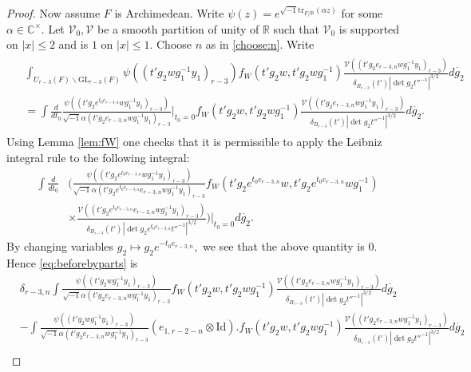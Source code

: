 \documentclass[12pt]{amsart}
\theoremstyle{remark}
\numberwithin{equation}{section}
\newcommand{\GL}{\mathrm{GL}}
\newcommand{\CC}{\mathbb{C}}
\newcommand{\RR}{\mathbb{R}}
\theoremstyle{definition}
\numberwithin{equation}{subsection}
\begin{document}
\begin{proof}
Now assume $F$ is Archimedean. 
Write $\psi(z)=e^{\sqrt{-1}\mathrm{tr}_{F/\RR}(\alpha z)}$ for some $\alpha \in \CC^\times.$  
Let $\mathcal{V}_0,\mathcal{V}$ be a smooth partition of unity of $\RR$ such that $\mathcal{V}_0$ is supported on $|x|\le 2$ and is $1$ on $|x|\le 1$. 
Choose $n$ as in \eqref{choose:n}. 
Write 
\begin{align}\begin{split}\label{eq:beforebyparts}
    &\int_{ U_{r-3}(F) \backslash \GL_{r-3}(F)}  \psi((t'g_2w g_1^{-1}y_1)_{r-3})f_{W}(t'g_2w,t'g_2wg_1^{-1})\frac{\mathcal{V}\left((t'g_2e_{r-3,n} wg_1^{-1}y_1)_{r-3}\right)}{\delta_{B_{r-3}}(t')|\det g_2t''^{-1}|^{3/2}}d\dot{g_2}\\
    &=\int \frac{d}{dt_0} \frac{\psi((t'g_2e^{t_0e_{r-3,n}}wg_1^{-1}y_1)_{r-3})}{\sqrt{-1}\alpha(t'g_2e_{r-3,n} wg_1^{-1}y_1)_{r-3}}\Bigg|_{t_0=0}f_{W}(t'g_2w,t'g_2wg_1^{-1})\frac{\mathcal{V}\left((t'g_2e_{r-3,n}w g_1^{-1}y_1)_{r-3}\right)}{\delta_{B_{r-3}}(t')|\det g_2t''^{-1}|^{3/2}}d\dot{g_2}. \end{split}
\end{align}
Using Lemma \ref{lem:fW} one checks that it is permissible to apply the 
 Leibniz integral rule to the following integral:
\begin{align*}
     \int \frac{d}{dt_0} &\Bigg(
\frac{\psi((t'g_2e^{t_0e_{r-3,n}}wg_1^{-1}y_1)_{r-3})}{\sqrt{-1}\alpha (t'g_2e^{t_0e_{r-3,n}}e_{r-3,n} wg_1^{-1}y_1)_{r-3}}
     f_{W}(t'g_2 e^{t_0e_{r-3,n}}w,t'g_2e^{t_0e_{r-3,n}}wg_1^{-1})\\& \times \frac{\mathcal{V}\left((t'g_2e^{t_0e_{r-3,n}}e_{r-3,n} wg_1^{-1}y_1)_{r-3}\right)}{\delta_{B_{r-3}}(t')|\det g_2e^{t_0e_{r-3,n}}t''^{-1}|^{3/2}}\Bigg)\Bigg|_{t_0=0}d\dot{g_2}.
\end{align*}
By changing variables $g_2 \mapsto g_2e^{-t_0e_{r-3,n}},$ we see that the above quantity is $0.$  Hence 
 \eqref{eq:beforebyparts} is 
\begin{align*}
&\delta_{r-3,n}\int
\frac{\psi((t'g_2wg_1^{-1}y_1)_{r-3})}{\sqrt{-1}\alpha (t'g_2e_{r-3,n}wg_1^{-1} y_1)_{r-3}}
     f_{W}(t'g_2w ,t'g_2wg_1^{-1})\frac{\mathcal{V}\left((t'g_2e_{r-3,n} wg_1^{-1}y_1)_{r-3}\right)}{\delta_{B_{r-3}}(t')|\det g_2t''^{-1}|^{3/2}}d\dot{g_2}\\
    &-\int\frac{\psi((t'g_2wg_1^{-1}y_1)_{r-3})}{\sqrt{-1}\alpha(t'g_2e_{r-3,n} wg_1^{-1}y_1)_{r-3}}(e_{1,r-2-n}\otimes \mathrm{Id}).f_{W}(t'g_2w,t'g_2wg_1^{-1})\frac{\mathcal{V}\left((t'g_2e_{r-3,n} wg_1^{-1}y_1)_{r-3}\right)}{\delta_{B_{r-3}}(t')|\det g_2t''^{-1}|^{3/2}}d\dot{g_2}\\

\end{align*}
\end{proof}
\end{document}
